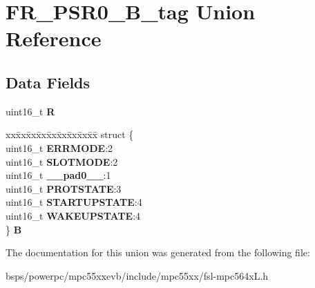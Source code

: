 \hypertarget{unionFR__PSR0__16B__tag}{}\section{F\+R\+\_\+\+P\+S\+R0\+\_\+B\+\_\+tag Union Reference}
\label{unionFR__PSR0__16B__tag}
\subsection*{Data Fields}
\begin{DoxyCompactItemize}
\item 
\mbox{\label{unionFR__PSR0__16B__tag_afc47ec5b772151742f84face906954c6}} 
uint16\+\_\+t {\bfseries R}
\item 
\mbox{\label{unionFR__PSR0__16B__tag_a2e9ecb3c2c70fb1d8cda627a1c5141d5}} 
\begin{tabbing}
xx\=xx\=xx\=xx\=xx\=xx\=xx\=xx\=xx\=\kill
struct \{\\
\>uint16\_t {\bfseries ERRMODE}:2\\
\>uint16\_t {\bfseries SLOTMODE}:2\\
\>uint16\_t {\bfseries \_\_pad0\_\_}:1\\
\>uint16\_t {\bfseries PROTSTATE}:3\\
\>uint16\_t {\bfseries STARTUPSTATE}:4\\
\>uint16\_t {\bfseries WAKEUPSTATE}:4\\
\} {\bfseries B}\\

\end{tabbing}\end{DoxyCompactItemize}


The documentation for this union was generated from the following file\+:\begin{DoxyCompactItemize}
\item 
bsps/powerpc/mpc55xxevb/include/mpc55xx/fsl-\/mpc564x\+L.\+h\end{DoxyCompactItemize}
